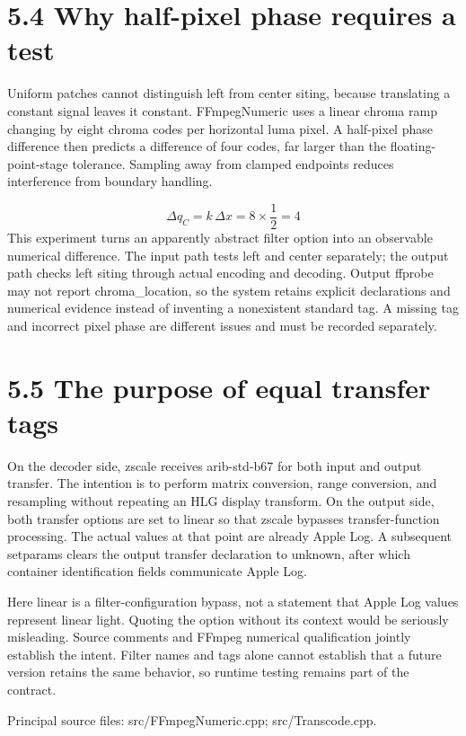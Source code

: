 \documentclass[11pt,a4paper,openany]{book}
\begin{document}
\section*{5.4 Why half-pixel phase requires a test}
Uniform patches cannot distinguish left from center siting, because translating a constant signal leaves it constant. FFmpegNumeric uses a linear chroma ramp changing by eight chroma codes per horizontal luma pixel. A half-pixel phase difference then predicts a difference of four codes, far larger than the floating-point-stage tolerance. Sampling away from clamped endpoints reduces interference from boundary handling.


\begin{equation}
\Delta q_C=k\,\Delta x=8\times\frac12=4
\end{equation}
This experiment turns an apparently abstract filter option into an observable numerical difference. The input path tests left and center separately; the output path checks left siting through actual encoding and decoding. Output ffprobe may not report chroma\_location, so the system retains explicit declarations and numerical evidence instead of inventing a nonexistent standard tag. A missing tag and incorrect pixel phase are different issues and must be recorded separately.


\section*{5.5 The purpose of equal transfer tags}
On the decoder side, zscale receives arib-std-b67 for both input and output transfer. The intention is to perform matrix conversion, range conversion, and resampling without repeating an HLG display transform. On the output side, both transfer options are set to linear so that zscale bypasses transfer-function processing. The actual values at that point are already Apple Log. A subsequent setparams clears the output transfer declaration to unknown, after which container identification fields communicate Apple Log.

Here linear is a filter-configuration bypass, not a statement that Apple Log values represent linear light. Quoting the option without its context would be seriously misleading. Source comments and FFmpeg numerical qualification jointly establish the intent. Filter names and tags alone cannot establish that a future version retains the same behavior, so runtime testing remains part of the contract.


\par\small Principal source files: src/FFmpegNumeric.cpp; src/Transcode.cpp.\normalsize
\end{document}
